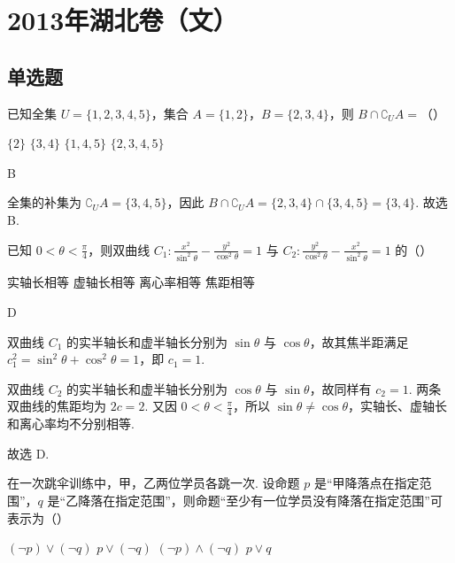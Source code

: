 \chapter{2013年湖北卷（文）}

\section{单选题}

\begin{problem}
已知全集 \(U = \{1, 2, 3, 4, 5\}\)，集合 \(A = \{1, 2\}\)，\(B = \{2, 3, 4\}\)，则 \(B \cap \complement_U A =\)（\quad）

\choices
    {\( \{2\} \)}
    {\(\{3,4\}\)}
    {\( \{1, 4, 5\} \)}
    {\(\{2, 3, 4, 5\}\)}
\end{problem}

\begin{answer}
B
\end{answer}

\begin{solution}
全集的补集为 \(\complement_U A=\{3,4,5\}\)，因此
\(B\cap\complement_U A=\{2,3,4\}\cap\{3,4,5\}=\{3,4\}\).
故选 B.
\end{solution}

\begin{problem}
已知 \(0 < \theta < \frac{\pi}{4}\)，则双曲线 \(C_{1}: \frac{x^{2}}{\sin^{2}\theta} - \frac{y^{2}}{\cos^{2}\theta} = 1\) 与 \(C_{2}: \frac{y^{2}}{\cos^{2}\theta} - \frac{x^{2}}{\sin^{2}\theta} = 1\) 的（\quad）

\choices
    {实轴长相等}
    {虚轴长相等}
    {离心率相等}
    {焦距相等}
\end{problem}

\begin{answer}
D
\end{answer}

\begin{solution}
双曲线 \(C_1\) 的实半轴长和虚半轴长分别为 \(\sin\theta\) 与 \(\cos\theta\)，故其焦半距满足
\(c_1^2=\sin^2\theta+\cos^2\theta=1\)，即 \(c_1=1\).

双曲线 \(C_2\) 的实半轴长和虚半轴长分别为 \(\cos\theta\) 与 \(\sin\theta\)，故同样有 \(c_2=1\). 两条双曲线的焦距均为 \(2c=2\). 又因 \(0<\theta<\frac{\pi}{4}\)，所以 \(\sin\theta\ne\cos\theta\)，实轴长、虚轴长和离心率均不分别相等.

故选 D.
\end{solution}

\begin{problem}
在一次跳伞训练中，甲，乙两位学员各跳一次. 设命题 \(p\) 是“甲降落点在指定范围”，\(q\) 是“乙降落在指定范围”，则命题“至少有一位学员没有降落在指定范围”可表示为（\quad）

\choices
    {\((\neg p)\vee(\neg q)\)}
    {\(p\vee(\neg q)\)}
    {\((\neg p)\wedge(\neg q)\)}
    {\(p\vee q\)}
\end{problem}

